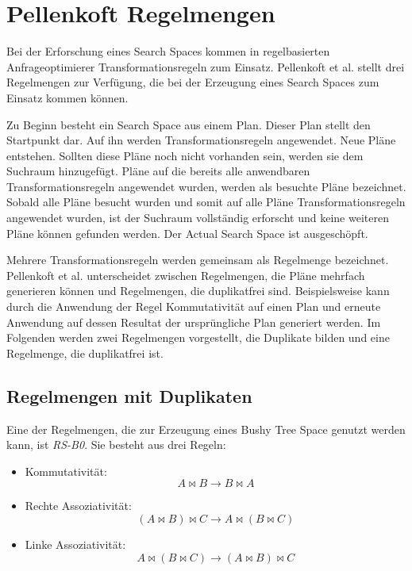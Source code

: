 \section{Pellenkoft Regelmengen}
\label{sec:pellenkoftRulesets}
Bei der Erforschung eines Search Spaces kommen in regelbasierten Anfrageoptimierer Transformationsregeln zum Einsatz. Pellenkoft et al. \cite{pellenkoft1997duplicate} \cite{manegold2000multi} \cite{pellenkoft1997complexity} stellt drei Regelmengen zur Verfügung, die bei der Erzeugung eines Search Spaces zum Einsatz kommen können.


Zu Beginn besteht ein Search Space aus einem Plan. Dieser Plan stellt den Startpunkt dar. Auf ihn werden Transformationsregeln angewendet. Neue Pläne entstehen. Sollten diese Pläne noch nicht vorhanden sein, werden sie dem Suchraum hinzugefügt. Pläne auf die bereits alle anwendbaren Transformationsregeln angewendet wurden, werden als besuchte Pläne bezeichnet. Sobald alle Pläne besucht wurden und somit auf alle Pläne Transformationsregeln angewendet wurden, ist der Suchraum vollständig erforscht und keine weiteren Pläne können gefunden werden. Der Actual Search Space ist ausgeschöpft.

Mehrere Transformationsregeln werden gemeinsam als Regelmenge bezeichnet. Pellenkoft et al. unterscheidet zwischen Regelmengen, die Pläne mehrfach generieren können und Regelmengen, die duplikatfrei sind. Beispielsweise kann durch die Anwendung der Regel Kommutativität auf einen Plan und erneute Anwendung auf dessen Resultat  der ursprüngliche Plan generiert werden. Im Folgenden werden zwei Regelmengen vorgestellt, die Duplikate bilden und eine Regelmenge, die duplikatfrei ist.


\subsection{Regelmengen mit Duplikaten}

Eine der Regelmengen, die zur Erzeugung eines Bushy Tree Space genutzt werden kann, ist \textit{RS-B0}. Sie besteht aus drei Regeln:

\begin{itemize}
\item Kommutativität: $$ A \Join B \to B \Join A$$
\item Rechte Assoziativität: $$(A \Join B) \Join C \to A \Join (B \Join C) $$
\item Linke Assoziativität: $$A \Join (B \Join C) \to (A \Join B) \Join C$$
\end{itemize}


